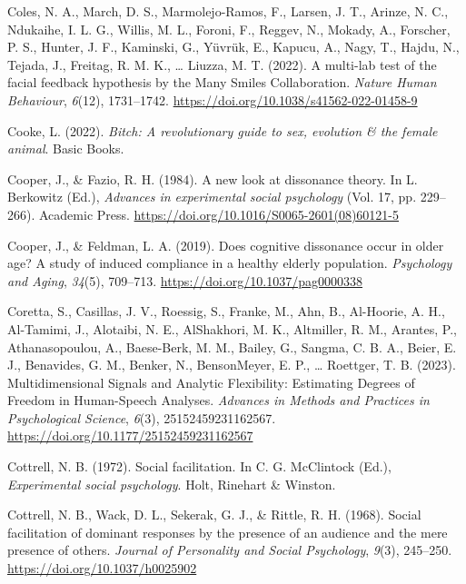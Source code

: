 \documentclass[
  letterpaper,
]{book}
\newlength{\cslhangindent}
\newenvironment{CSLReferences}[2] %
 {\begin{list}{}{%
  \setlength{\itemindent}{0pt}
  \setlength{\leftmargin}{0pt}
  \setlength{\parsep}{0pt}
  \ifodd #1
   \setlength{\leftmargin}{\cslhangindent}
   \setlength{\itemindent}{-1\cslhangindent}
  \fi
  \setlength{\itemsep}{#2\baselineskip}}}
 {\end{list}}
\begin{document}
\begin{CSLReferences}{1}{0}
Coles, N. A., March, D. S., Marmolejo-Ramos, F., Larsen, J. T., Arinze,
N. C., Ndukaihe, I. L. G., Willis, M. L., Foroni, F., Reggev, N.,
Mokady, A., Forscher, P. S., Hunter, J. F., Kaminski, G., Yüvrük, E.,
Kapucu, A., Nagy, T., Hajdu, N., Tejada, J., Freitag, R. M. K., \ldots{}
Liuzza, M. T. (2022). A multi-lab test of the facial feedback hypothesis
by the {Many} {Smiles} {Collaboration}. \emph{Nature Human Behaviour},
\emph{6}(12), 1731--1742.
\url{https://doi.org/10.1038/s41562-022-01458-9}

Cooke, L. (2022). \emph{Bitch: {A} revolutionary guide to sex, evolution
\& the female animal}. Basic Books.

Cooper, J., \& Fazio, R. H. (1984). A new look at dissonance theory. In
L. Berkowitz (Ed.), \emph{Advances in experimental social psychology}
(Vol. 17, pp. 229--266). Academic Press.
\url{https://doi.org/10.1016/S0065-2601(08)60121-5}

Cooper, J., \& Feldman, L. A. (2019). Does cognitive dissonance occur in
older age? A study of induced compliance in a healthy elderly
population. \emph{Psychology and Aging}, \emph{34}(5), 709--713.
\url{https://doi.org/10.1037/pag0000338}

Coretta, S., Casillas, J. V., Roessig, S., Franke, M., Ahn, B.,
Al-Hoorie, A. H., Al-Tamimi, J., Alotaibi, N. E., AlShakhori, M. K.,
Altmiller, R. M., Arantes, P., Athanasopoulou, A., Baese-Berk, M. M.,
Bailey, G., Sangma, C. B. A., Beier, E. J., Benavides, G. M., Benker,
N., BensonMeyer, E. P., \ldots{} Roettger, T. B. (2023).
Multidimensional {Signals} and {Analytic} {Flexibility}: {Estimating}
{Degrees} of {Freedom} in {Human}-{Speech} {Analyses}. \emph{Advances in
Methods and Practices in Psychological Science}, \emph{6}(3),
25152459231162567. \url{https://doi.org/10.1177/25152459231162567}

Cottrell, N. B. (1972). Social facilitation. In C. G. McClintock (Ed.),
\emph{Experimental social psychology}. Holt, Rinehart \& Winston.

Cottrell, N. B., Wack, D. L., Sekerak, G. J., \& Rittle, R. H. (1968).
Social facilitation of dominant responses by the presence of an audience
and the mere presence of others. \emph{Journal of Personality and Social
Psychology}, \emph{9}(3), 245--250.
\url{https://doi.org/10.1037/h0025902}


\end{CSLReferences}
\end{document}
